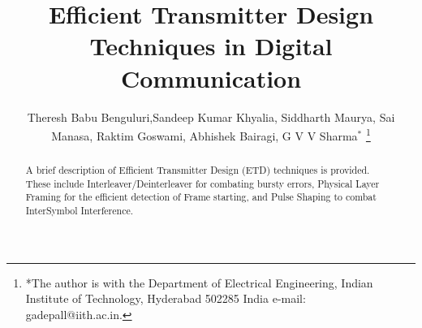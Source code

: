 \documentclass[journal,12pt,twocolumn]{IEEEtran}
\begin{document}


\let\StandardTheFigure\thefigure
\let\StandardTheTable\thetable





\def\putbox#1#2#3{\makebox[0in][l]{\makebox[#1][l]{}\raisebox{\baselineskip}[0in][0in]{\raisebox{#2}[0in][0in]{#3}}}}
     \def\rightbox#1{\makebox[0in][r]{#1}}
     \def\centbox#1{\makebox[0in]{#1}}
     \def\topbox#1{\raisebox{-\baselineskip}[0in][0in]{#1}}
     \def\midbox#1{\raisebox{-0.5\baselineskip}[0in][0in]{#1}}




\title{ 
Efficient Transmitter Design Techniques in Digital Communication
}



\author{Theresh Babu Benguluri,Sandeep Kumar Khyalia, Siddharth Maurya, Sai Manasa, Raktim Goswami, Abhishek Bairagi, G V V Sharma$^{*}$%
\thanks{*The author is with the Department
of Electrical Engineering, Indian Institute of Technology, Hyderabad
502285 India e-mail:  gadepall@iith.ac.in.}
}


\maketitle

\tableofcontents

\bigskip
%
\begin{abstract}
A brief description of  Efficient Transmitter Design (ETD) techniques is provided. These include Interleaver/Deinterleaver for combating bursty errors, Physical Layer Framing for the efficient detection of Frame starting, and  Pulse Shaping to combat  InterSymbol Interference.
\end{abstract}

\end{document}
